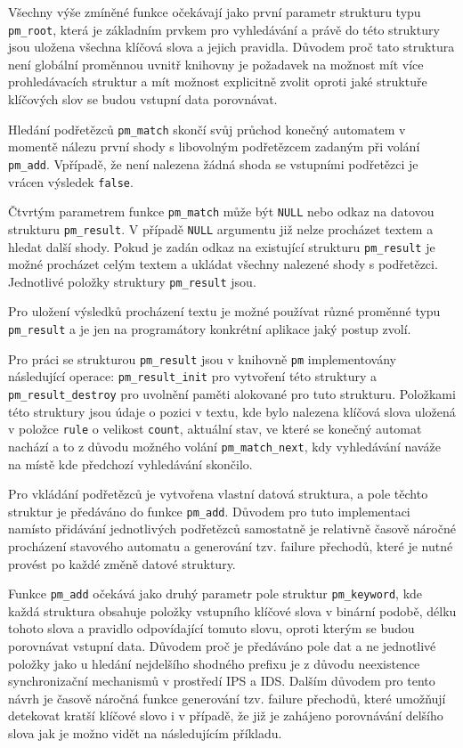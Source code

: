 Všechny výše zmíněné funkce očekávají jako první parametr strukturu typu \texttt{pm\_root},
která je základním prvkem pro vyhledávání a právě do této struktury
jsou uložena všechna klíčová slova a jejich pravidla. Důvodem proč tato struktura není globální
proměnnou uvnitř knihovny je požadavek na možnost mít více prohledávacích struktur
a mít možnost explicitně zvolit oproti jaké struktuře klíčových slov se budou vstupní data porovnávat.

Hledání podřetězců \texttt{pm\_match} skončí svůj průchod konečný automatem v momentě nálezu první shody
s libovolným podřetězcem zadaným při volání \texttt{pm\_add}. Vpřípadě, že není nalezena žádná shoda
se vstupními podřetězci je vrácen výsledek \texttt{false}.

Čtvrtým parametrem funkce \texttt{pm\_match} může být \texttt{NULL} nebo odkaz na datovou strukturu
\texttt{pm\_result}. V případě \texttt{NULL} argumentu již nelze procházet textem a hledat další shody.
Pokud je zadán odkaz na existující strukturu \texttt{pm\_result} je možné procházet celým textem a ukládat
všechny nalezené shody s podřetězci. Jednotlivé položky struktury \texttt{pm\_result} jsou.

Pro uložení výsledků procházení textu je možné používat různé proměnné typu \texttt{pm\_result}
a je jen na programátory konkrétní aplikace jaký postup zvolí.

Pro práci se strukturou \texttt{pm\_result} jsou v knihovně \texttt{pm} implementovány následující operace:
\texttt{pm\_result\_init} pro vytvoření této struktury a \texttt{pm\_result\_destroy} pro
uvolnění paměti alokované pro tuto strukturu. Položkami této struktury jsou údaje o pozici v textu,
kde bylo nalezena klíčová slova uložená v položce \texttt{rule} o velikost \texttt{count},
aktuální stav, ve které se konečný automat nachází a to z důvodu možného volání
\texttt{pm\_match\_next}, kdy vyhledávání naváže na místě kde předchozí vyhledávání skončilo.

Pro vkládání podřetězců je vytvořena vlastní datová struktura, a pole těchto struktur je předáváno do funkce
\texttt{pm\_add}. Důvodem pro tuto implementaci namísto přidávání jednotlivých podřetězců samostatně
je relativně časově náročné procházení stavového automatu a generování tzv. failure přechodů,
které je nutné provést po každé změně datové struktury.

Funkce \texttt{pm\_add} očekává jako druhý parametr pole struktur \texttt{pm\_keyword}, kde každá struktura
obsahuje položky vstupního klíčové slova v binární podobě, délku tohoto slova a pravidlo odpovídající tomuto slovu, oproti kterým se budou porovnávat vstupní data. Důvodem proč je předáváno pole dat a ne jednotlivé položky
jako u hledání nejdelšího shodného prefixu je z důvodu neexistence synchronizační mechanismů
v prostředí IPS a IDS. Dalším důvodem pro tento návrh je časově náročná funkce generování
tzv. failure přechodů, které umožňují detekovat kratší klíčové slovo i v případě, že již je
zahájeno porovnávání delšího slova jak je možno vidět na následujícím příkladu.

